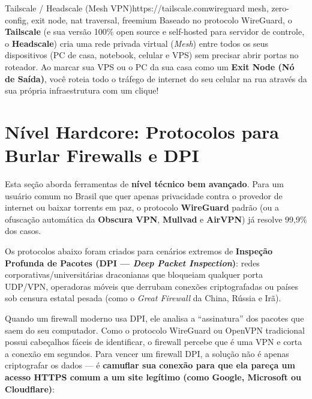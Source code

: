\documentclass{pousadaguide}
\begin{document}
\begin{ferramenta}[recomendado,logo=tailscale]{Tailscale / Headscale (Mesh VPN)}{https://tailscale.com}{wireguard mesh, zero-config, exit node, nat traversal, freemium}
Baseado no protocolo WireGuard, o \textbf{Tailscale} (e sua versão 100\% open source e self-hosted para servidor de controle, o \textbf{Headscale}) cria uma rede privada virtual (\emph{Mesh}) entre todos os seus dispositivos (PC de casa, notebook, celular e VPS) sem precisar abrir portas no roteador. Ao marcar sua VPS ou o PC da sua casa como um \textbf{Exit Node (Nó de Saída)}, você roteia todo o tráfego de internet do seu celular na rua através da sua própria infraestrutura com um clique! 
\end{ferramenta}

\section{Nível Hardcore: Protocolos para Burlar Firewalls e DPI}

\begin{atencao}
Esta seção aborda ferramentas de \textbf{nível técnico bem avançado}. Para um usuário comum no Brasil que quer apenas privacidade contra o provedor de internet ou baixar torrents em paz, o protocolo \textbf{WireGuard} padrão (ou a ofuscação automática da \textbf{Obscura VPN}, \textbf{Mullvad} e \textbf{AirVPN}) já resolve 99,9\% dos casos.

Os protocolos abaixo foram criados para cenários extremos de \textbf{Inspeção Profunda de Pacotes (DPI — \emph{Deep Packet Inspection})}: redes corporativas/universitárias draconianas que bloqueiam qualquer porta UDP/VPN, operadoras móveis que derrubam conexões criptografadas ou países sob censura estatal pesada (como o \emph{Great Firewall} da China, Rússia e Irã).
\end{atencao}

Quando um firewall moderno usa DPI, ele analisa a ``assinatura'' dos pacotes que saem do seu computador. Como o protocolo WireGuard ou OpenVPN tradicional possui cabeçalhos fáceis de identificar, o firewall percebe que é uma VPN e corta a conexão em segundos. Para vencer um firewall DPI, a solução não é apenas criptografar os dados — é \textbf{camuflar sua conexão para que ela pareça um acesso HTTPS comum a um site legítimo (como Google, Microsoft ou Cloudflare)}:
\end{document}
